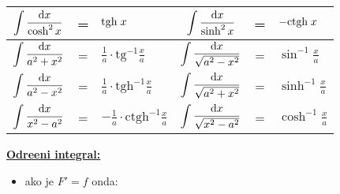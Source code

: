 \documentclass[12pt,oneside,a4paper]{report}
\begin{document}
\begin{center}
\begin{tabular}{|ccl|ccl|}
$\displaystyle \int \frac{\textrm dx }{\cosh^2 x}$ & = & $\displaystyle \textrm{tgh}\hspace{1mm}x$  & $\displaystyle
\int \frac{\textrm dx }{\sinh^2 x}$ & = & $\displaystyle -\textrm{ctgh}\hspace{1mm}x$\\
\hline

$\displaystyle \int \frac{\textrm dx }{a^2+x^2}$ & = & $\displaystyle \frac 1a \cdot \textrm{tg}^{-1}\frac xa$  & $\displaystyle \int \frac{\textrm dx }{\sqrt{a^2-x^2}}$ & = & $\displaystyle \sin^{-1}\frac xa$\\

$\displaystyle \int \frac{\textrm dx }{a^2-x^2}$ & = & $\displaystyle \frac 1a \cdot \textrm{tgh}^{-1}\frac xa$ & $\displaystyle \int \frac{\textrm dx }{\sqrt{a^2+x^2}}$ & = & $\displaystyle \sinh^{-1}\frac xa$  \\

$\displaystyle \int \frac{\textrm dx }{x^2-a^2}$ & = & $\displaystyle -\frac 1a \cdot \textrm{ctgh}^{-1}\frac xa$ & $\displaystyle \int \frac{\textrm dx }{\sqrt{x^2-a^2}}$ & = & $\displaystyle \cosh^{-1}\frac xa$\\
\hline

\end{tabular}
\end{center}

\vspace{3mm}
\noindent
\underline{\textbf{Odre\dj{}eni integral:}}
\begin{itemize}
\item ako je $F'=f$ onda: 
\end{itemize}
\end{document}
